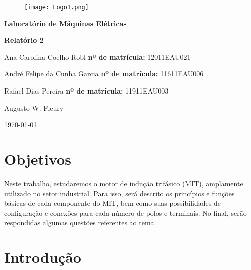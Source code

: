 \documentclass[a4paper,12pt,oneside]{article}
\begin{document}
\thispagestyle{empty}

\begin{center}
\begin{figure}\centering
\texttt{[image: Logo1.png]}
\end{figure}\*


\vspace{5cm}

{\Large\bfseries 
Laboratório de Máquinas Elétricas}

\vspace{0.5cm}

{\Large\bfseries 
Relatório 2}
\end{center}

\vspace{8cm}

 Ana Carolina Coelho Robl \hfill {\bfseries nº de matrícula:} 12011EAU021

 André Felipe da Cunha Garcia \hfill {\bfseries nº de matrícula:} 11611EAU006

 Rafael Dias Pereira \hfill {\bfseries nº de matrícula:} 11911EAU003

 Augusto W. Fleury

\vfill
\begin{center}
\large \today
\end{center}



\newpage
\tableofcontents\newpage
{}

\section{Objetivos}\hspace{0pt}

Neste trabalho, estudaremos o motor de indução trifásico (MIT), amplamente utilizado no setor industrial. Para isso, será descrito os princípios e funções básicas de cada componente do MIT, bem como suas possibilidades de configuração e conexões para cada número de polos e terminais. No final, serão respondidas algumas questões referentes ao tema.

\newpage
\section{Introdução}\hspace{0pt}
\end{document}
